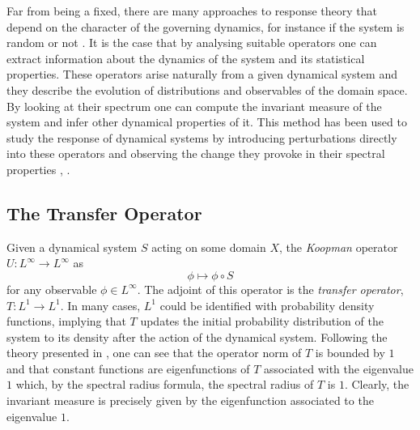 Far from being a fixed, there are many approaches to response theory that depend on the character of the governing dynamics, for instance if the system is random or not \cite{review}. It is the case that by analysing suitable operators one can extract information about the dynamics of the system and its statistical properties. These operators arise naturally from a given dynamical system and they describe the evolution of distributions and observables of the domain space. By looking at their spectrum one can compute the invariant measure of the system and infer other dynamical properties of it. This method has been used to study the response of dynamical systems by introducing perturbations directly into these operators and observing the change they provoke in their spectral properties \cite{review}, \cite{chekroun}.

\subsection*{The Transfer Operator}

Given a dynamical system $S$ acting on some domain $X$, the \emph{Koopman} operator $U:L^{\infty}\longrightarrow L^{\infty}$ as
\begin{equation}
	\phi \mapsto \phi \circ S
\end{equation}
for any observable $\phi \in L^{\infty}$. The adjoint of this operator is the \emph{transfer operator}, $T:L^1 \longrightarrow L^1$. In many cases, $L^1$ could be identified with probability density functions, implying that $T$ updates the initial probability distribution of the system to its density after the action of the dynamical system. Following the theory presented in \cite{lasota}, one can see that the operator norm of $T$ is bounded by $1$ and that constant functions are eigenfunctions of $T$ associated with the eigenvalue $1$ which, by the spectral radius formula, the spectral radius of $T$ is $1$. Clearly, the invariant measure is precisely given by the eigenfunction associated to the eigenvalue $1$.

